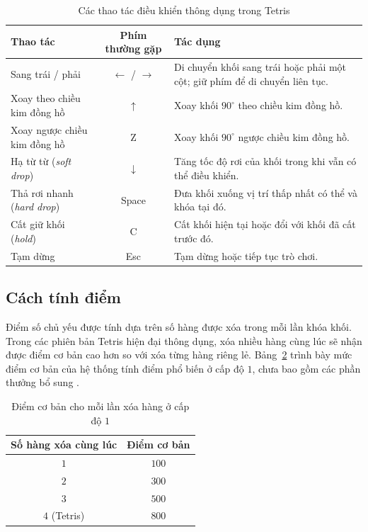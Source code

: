\documentclass[12pt,a4paper,oneside]{report}
\begin{document}
\begin{table}[H]
\centering
\caption{Các thao tác điều khiển thông dụng trong Tetris}
\label{tab:dieu_khien}
\begin{tabular}{>{\raggedright\arraybackslash}p{3.8cm} c >{\raggedright\arraybackslash}p{6.6cm}}
\toprule
\textbf{Thao tác} & \textbf{Phím thường gặp} & \textbf{Tác dụng} \\
\midrule
Sang trái / phải & $\leftarrow$ / $\rightarrow$ & Di chuyển khối sang trái hoặc phải một cột; giữ phím để di chuyển liên tục. \\
Xoay theo chiều kim đồng hồ & $\uparrow$ & Xoay khối $90^\circ$ theo chiều kim đồng hồ. \\
Xoay ngược chiều kim đồng hồ & Z & Xoay khối $90^\circ$ ngược chiều kim đồng hồ. \\
Hạ từ từ (\textit{soft drop}) & $\downarrow$ & Tăng tốc độ rơi của khối trong khi vẫn có thể điều khiển. \\
Thả rơi nhanh (\textit{hard drop}) & Space & Đưa khối xuống vị trí thấp nhất có thể và khóa tại đó. \\
Cất giữ khối (\textit{hold}) & C & Cất khối hiện tại hoặc đổi với khối đã cất trước đó. \\
Tạm dừng & Esc & Tạm dừng hoặc tiếp tục trò chơi. \\
\bottomrule
\end{tabular}
\end{table}

\subsection{Cách tính điểm}

Điểm số chủ yếu được tính dựa trên số hàng được xóa trong mỗi
lần khóa khối. Trong các phiên bản Tetris hiện đại thông dụng,
xóa nhiều hàng cùng lúc sẽ nhận được điểm cơ bản cao hơn so với
xóa từng hàng riêng lẻ. Bảng~\ref{tab:diem_chung} trình bày mức
điểm cơ bản của hệ thống tính điểm phổ biến ở cấp độ $1$, chưa
bao gồm các phần thưởng bổ sung
\cite{tetris_scoring,tetris_official}.

\begin{table}[H]
\centering
\caption{Điểm cơ bản cho mỗi lần xóa hàng ở cấp độ $1$}
\label{tab:diem_chung}
\begin{tabular}{c c}
\toprule
\textbf{Số hàng xóa cùng lúc} & \textbf{Điểm cơ bản} \\
\midrule
$1$ & $100$ \\
$2$ & $300$ \\
$3$ & $500$ \\
$4$ (Tetris) & $800$ \\
\bottomrule
\end{tabular}
\end{table}
\end{document}
